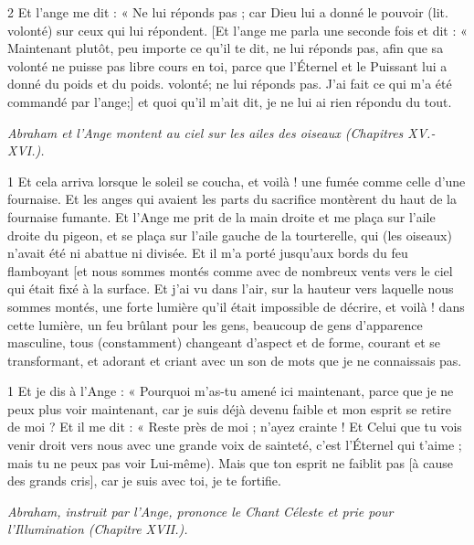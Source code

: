 \par 2 Et l'ange me dit : « Ne lui réponds pas ; car Dieu lui a donné le pouvoir (lit. volonté) sur ceux qui lui répondent. [Et l'ange me parla une seconde fois et dit : « Maintenant plutôt, peu importe ce qu'il te dit, ne lui réponds pas, afin que sa volonté ne puisse pas libre cours en toi, parce que l'Éternel et le Puissant lui a donné du poids et du poids. volonté; ne lui réponds pas. J'ai fait ce qui m'a été commandé par l'ange;] et quoi qu'il m'ait dit, je ne lui ai rien répondu du tout.


\par \textit{Abraham et l'Ange montent au ciel sur les ailes des oiseaux (Chapitres XV.-XVI.).}

\par 1 Et cela arriva lorsque le soleil se coucha, et voilà ! une fumée comme celle d'une fournaise. Et les anges qui avaient les parts du sacrifice montèrent du haut de la fournaise fumante. Et l'Ange me prit de la main droite et me plaça sur l'aile droite du pigeon, et se plaça sur l'aile gauche de la tourterelle, qui (les oiseaux) n'avait été ni abattue ni divisée. Et il m'a porté jusqu'aux bords du feu flamboyant [et nous sommes montés comme avec de nombreux vents vers le ciel qui était fixé à la surface. Et j'ai vu dans l'air, sur la hauteur vers laquelle nous sommes montés, une forte lumière qu'il était impossible de décrire, et voilà ! dans cette lumière, un feu brûlant pour les gens, beaucoup de gens d'apparence masculine, tous (constamment) changeant d'aspect et de forme, courant et se transformant, et adorant et criant avec un son de mots que je ne connaissais pas.


\par 1 Et je dis à l'Ange : « Pourquoi m'as-tu amené ici maintenant, parce que je ne peux plus voir maintenant, car je suis déjà devenu faible et mon esprit se retire de moi ? Et il me dit : « Reste près de moi ; n'ayez crainte ! Et Celui que tu vois venir droit vers nous avec une grande voix de sainteté, c'est l'Éternel qui t'aime ; mais tu ne peux pas voir Lui-même). Mais que ton esprit ne faiblit pas [à cause des grands cris], car je suis avec toi, je te fortifie.


\par \textit{Abraham, instruit par l'Ange, prononce le Chant Céleste et prie pour l'Illumination (Chapitre XVII.).}

